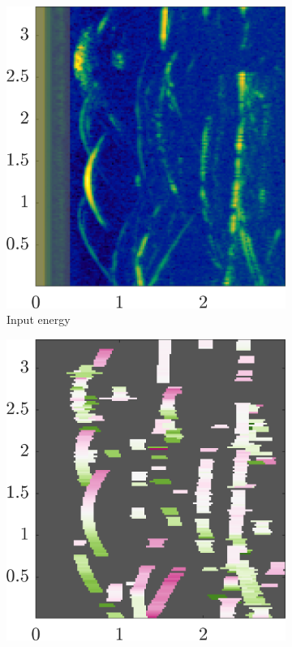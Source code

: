 \begin{figure}[htbp]
    \centering
    \begin{subfigure}[t]{0.32\linewidth}
        \centering
        \includegraphics[width=\linewidth]{gfx/results/basement_input.png}
        \caption{\small Input energy}
    \end{subfigure}%
    \hfill%
    \begin{subfigure}[t]{0.32\linewidth}  
        \centering 
        \includegraphics[width=\linewidth]{gfx/results/basement_doppler.png}

\end{subfigure}
\end{figure}
